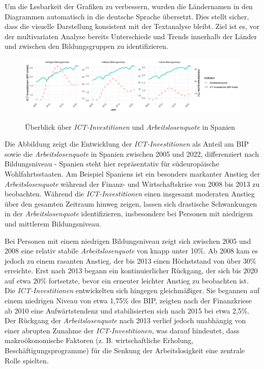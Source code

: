 Um die Lesbarkeit der Grafiken zu verbessern, wurden die Ländernamen in den Diagrammen 
automatisch in die deutsche Sprache übersetzt. Dies stellt sicher, dass die visuelle 
Darstellung konsistent mit der Textanalyse bleibt. Ziel ist es, vor der multivariaten Analyse 
bereits Unterschiede und Trends innerhalb der Länder und zwischen den Bildungsgruppen zu 
identifizieren.

\begin{figure}[htbp]
    \centering
    \caption{Überblick über \textit{\ac{ICT}-Investitionen} und \textit{Arbeitslosenquote} 
    in Spanien}
    \includegraphics[width=\textwidth]{assets/plot_spain_final.png}
    \label{fig:spain}
\end{figure}

Die Abbildung zeigt die Entwicklung der \textit{\ac{ICT}-Investitionen} als Anteil am 
BIP sowie die \textit{Arbeitslosenquote} in Spanien zwischen 2005 und 2022, differenziert 
nach Bildungsniveau - Spanien steht hier repräsentativ für südeuropäische Wohlfahrtsstaaten. 
Am Beispiel Spaniens ist ein besonders markanter Anstieg der \textit{Arbeitslosenquote} 
während der Finanz- und Wirtschaftskrise von 2008 bis 2013 zu beobachten. Während die 
\textit{\ac{ICT}-Investitionen} einen insgesamt moderaten Anstieg über den gesamten 
Zeitraum hinweg zeigen, lassen sich drastische Schwankungen in der 
\textit{Arbeitslosenquote} identifizieren, insbesondere bei Personen mit niedrigem und 
mittlerem Bildungsniveau.

Bei Personen mit einem niedrigen Bildungsniveau zeigt sich zwischen 2005 und 2008 
eine relativ stabile \textit{Arbeitslosenquote} von knapp unter 10\%. Ab 2008 kam es 
jedoch zu einem rasanten Anstieg, der bis 2013 einen Höchststand von über 30\% erreichte. 
Erst nach 2013 begann ein kontinuierlicher Rückgang, der sich bis 2020 auf etwa 20\% 
fortsetzte, bevor ein erneuter leichter Anstieg zu beobachten ist. Die 
\textit{\ac{ICT}-Investitionen} entwickelten sich hingegen gleichmäßiger. Sie begannen 
auf einem niedrigen Niveau von etwa 1,75\% des BIP, zeigten nach der Finanzkriese ab 
2010 eine Aufwärtstendenz und stabilisierten sich nach 2015 bei etwa 2,5\%. Der 
Rückgang der \textit{Arbeitslosenquote} nach 2013 verlief jedoch unabhängig von einer 
abrupten Zunahme der \textit{\ac{ICT}-Investitionen}, was darauf hindeutet, dass 
makroökonomische Faktoren (z. B. wirtschaftliche Erholung, Beschäftigungsprogramme) 
für die Senkung der Arbeitslosigkeit eine zentrale Rolle spielten.


